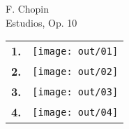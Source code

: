 \documentclass[a4paper,13pt,oneside,headinclude,titlepage]{article} %
\newcommand{\imgw}{0.67}
\newlength{\colw}
\newcommand{\tn}{\tabularnewline}
\begin{document}
\begin{center}
\vfill
{\huge F. Chopin}\\[1ex]
{\huge Estudios, Op. 10}\\[1ex]
\vfill
\begin{tabular}{>{\bfseries}m{2ex}m{\colw}}
1.&\texttt{[image: out/01]}\tn
2.&\texttt{[image: out/02]}\tn
3.&\texttt{[image: out/03]}\tn
4.&\texttt{[image: out/04]}\tn
\end{tabular}
\end{center}
\vfill
\end{document}
